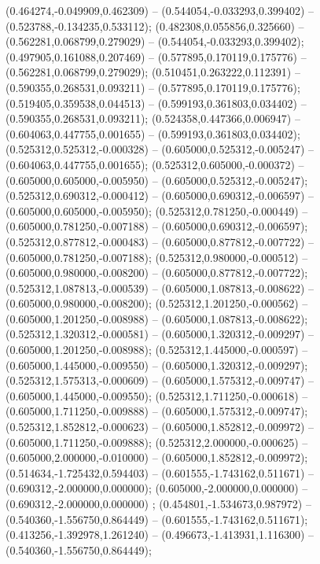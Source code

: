  (0.464274,-0.049909,0.462309) -- (0.544054,-0.033293,0.399402) -- (0.523788,-0.134235,0.533112);
 (0.482308,0.055856,0.325660) -- (0.562281,0.068799,0.279029) -- (0.544054,-0.033293,0.399402);
 (0.497905,0.161088,0.207469) -- (0.577895,0.170119,0.175776) -- (0.562281,0.068799,0.279029);
 (0.510451,0.263222,0.112391) -- (0.590355,0.268531,0.093211) -- (0.577895,0.170119,0.175776);
 (0.519405,0.359538,0.044513) -- (0.599193,0.361803,0.034402) -- (0.590355,0.268531,0.093211);
 (0.524358,0.447366,0.006947) -- (0.604063,0.447755,0.001655) -- (0.599193,0.361803,0.034402);
 (0.525312,0.525312,-0.000328) -- (0.605000,0.525312,-0.005247) -- (0.604063,0.447755,0.001655);
 (0.525312,0.605000,-0.000372) -- (0.605000,0.605000,-0.005950) -- (0.605000,0.525312,-0.005247);
 (0.525312,0.690312,-0.000412) -- (0.605000,0.690312,-0.006597) -- (0.605000,0.605000,-0.005950);
 (0.525312,0.781250,-0.000449) -- (0.605000,0.781250,-0.007188) -- (0.605000,0.690312,-0.006597);
 (0.525312,0.877812,-0.000483) -- (0.605000,0.877812,-0.007722) -- (0.605000,0.781250,-0.007188);
 (0.525312,0.980000,-0.000512) -- (0.605000,0.980000,-0.008200) -- (0.605000,0.877812,-0.007722);
 (0.525312,1.087813,-0.000539) -- (0.605000,1.087813,-0.008622) -- (0.605000,0.980000,-0.008200);
 (0.525312,1.201250,-0.000562) -- (0.605000,1.201250,-0.008988) -- (0.605000,1.087813,-0.008622);
 (0.525312,1.320312,-0.000581) -- (0.605000,1.320312,-0.009297) -- (0.605000,1.201250,-0.008988);
 (0.525312,1.445000,-0.000597) -- (0.605000,1.445000,-0.009550) -- (0.605000,1.320312,-0.009297);
 (0.525312,1.575313,-0.000609) -- (0.605000,1.575312,-0.009747) -- (0.605000,1.445000,-0.009550);
 (0.525312,1.711250,-0.000618) -- (0.605000,1.711250,-0.009888) -- (0.605000,1.575312,-0.009747);
 (0.525312,1.852812,-0.000623) -- (0.605000,1.852812,-0.009972) -- (0.605000,1.711250,-0.009888);
 (0.525312,2.000000,-0.000625) -- (0.605000,2.000000,-0.010000) -- (0.605000,1.852812,-0.009972);
 (0.514634,-1.725432,0.594403) -- (0.601555,-1.743162,0.511671) -- (0.690312,-2.000000,0.000000);
 (0.605000,-2.000000,0.000000) -- (0.690312,-2.000000,0.000000) ;
 (0.454801,-1.534673,0.987972) -- (0.540360,-1.556750,0.864449) -- (0.601555,-1.743162,0.511671);
 (0.413256,-1.392978,1.261240) -- (0.496673,-1.413931,1.116300) -- (0.540360,-1.556750,0.864449);
